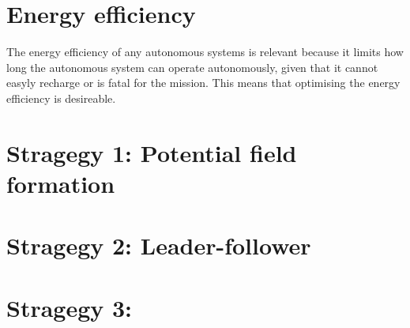 \section{Energy efficiency}
The energy efficiency of any autonomous systems is relevant because it limits how long the autonomous system can operate autonomously, given that it cannot easyly recharge or is fatal for the mission. This means that optimising the energy efficiency is desireable.

\section{Stragegy 1: Potential field formation}
\section{Stragegy 2: Leader-follower}
\section{Stragegy 3: }


